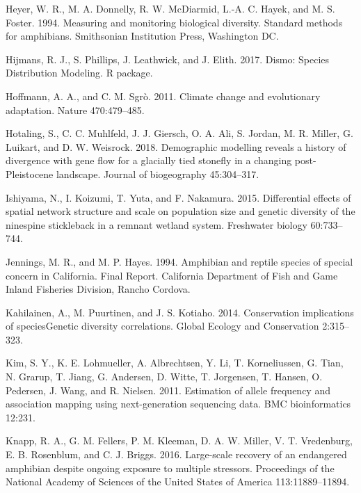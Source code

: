\documentclass[proquest,12pt,final]{ucthesis-CA2012} %
\begin{document}
\begin{ucmainmatter}
\leavevmode\hypertarget{ref-heyer_measuring_1994}{}%
Heyer, W. R., M. A. Donnelly, R. W. McDiarmid, L.-A. C. Hayek, and M. S.
Foster. 1994. Measuring and monitoring biological diversity. Standard
methods for amphibians. Smithsonian Institution Press, Washington DC.

\leavevmode\hypertarget{ref-hijmans_dismo_2017}{}%
Hijmans, R. J., S. Phillips, J. Leathwick, and J. Elith. 2017. Dismo:
Species Distribution Modeling. R package.

\leavevmode\hypertarget{ref-hoffmann_climate_2011}{}%
Hoffmann, A. A., and C. M. Sgrò. 2011. Climate change and evolutionary
adaptation. Nature 470:479--485.

\leavevmode\hypertarget{ref-hotaling_demographic_2018}{}%
Hotaling, S., C. C. Muhlfeld, J. J. Giersch, O. A. Ali, S. Jordan, M. R.
Miller, G. Luikart, and D. W. Weisrock. 2018. Demographic modelling
reveals a history of divergence with gene flow for a glacially tied
stonefly in a changing post-Pleistocene landscape. Journal of
biogeography 45:304--317.

\leavevmode\hypertarget{ref-ishiyama_differential_2015}{}%
Ishiyama, N., I. Koizumi, T. Yuta, and F. Nakamura. 2015. Differential
effects of spatial network structure and scale on population size and
genetic diversity of the ninespine stickleback in a remnant wetland
system. Freshwater biology 60:733--744.

\leavevmode\hypertarget{ref-jennings_amphibian_1994}{}%
Jennings, M. R., and M. P. Hayes. 1994. Amphibian and reptile species of
special concern in California. Final Report. California Department of
Fish and Game Inland Fisheries Division, Rancho Cordova.

\leavevmode\hypertarget{ref-kahilainen_conservation_2014}{}%
Kahilainen, A., M. Puurtinen, and J. S. Kotiaho. 2014. Conservation
implications of speciesGenetic diversity correlations. Global Ecology
and Conservation 2:315--323.

\leavevmode\hypertarget{ref-kim_estimation_2011}{}%
Kim, S. Y., K. E. Lohmueller, A. Albrechtsen, Y. Li, T. Korneliussen, G.
Tian, N. Grarup, T. Jiang, G. Andersen, D. Witte, T. Jorgensen, T.
Hansen, O. Pedersen, J. Wang, and R. Nielsen. 2011. Estimation of allele
frequency and association mapping using next-generation sequencing data.
BMC bioinformatics 12:231.

\leavevmode\hypertarget{ref-knapp_large-scale_2016}{}%
Knapp, R. A., G. M. Fellers, P. M. Kleeman, D. A. W. Miller, V. T.
Vredenburg, E. B. Rosenblum, and C. J. Briggs. 2016. Large-scale
recovery of an endangered amphibian despite ongoing exposure to multiple
stressors. Proceedings of the National Academy of Sciences of the United
States of America 113:11889--11894.


\end{ucmainmatter}
\end{document}
